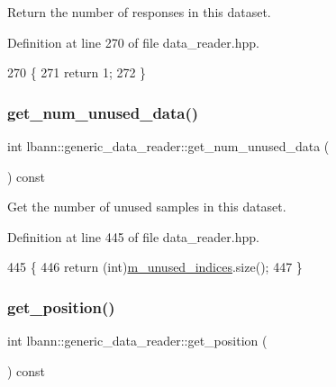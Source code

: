 Return the number of responses in this dataset. 



Definition at line 270 of file data\+\_\+reader.\+hpp.


\begin{DoxyCode}
270                                         \{
271     \textcolor{keywordflow}{return} 1;
272   \}
\end{DoxyCode}
\mbox{\label{classlbann_1_1generic__data__reader_a49d5244c292de9ca489761b940958afd}} 
\subsubsection{\texorpdfstring{get\+\_\+num\+\_\+unused\+\_\+data()}{get\_num\_unused\_data()}}
{\footnotesize\ttfamily int lbann\+::generic\+\_\+data\+\_\+reader\+::get\+\_\+num\+\_\+unused\+\_\+data (\begin{DoxyParamCaption}{ }\end{DoxyParamCaption}) const\hspace{0.3cm}{\ttfamily [inline]}}



Get the number of unused samples in this dataset. 



Definition at line 445 of file data\+\_\+reader.\+hpp.


\begin{DoxyCode}
445                                   \{
446     \textcolor{keywordflow}{return} (\textcolor{keywordtype}{int})\hyperlink{classlbann_1_1generic__data__reader_a0bc0ee42e95d23687ddcc30d6c338b19}{m\_unused\_indices}.size();
447   \}
\end{DoxyCode}
\mbox{\label{classlbann_1_1generic__data__reader_aa6e4e7a49d30502a0c60c39720ac2499}} 
\subsubsection{\texorpdfstring{get\+\_\+position()}{get\_position()}}
{\footnotesize\ttfamily int lbann\+::generic\+\_\+data\+\_\+reader\+::get\+\_\+position (\begin{DoxyParamCaption}{ }\end{DoxyParamCaption}) const\hspace{0.3cm}{\ttfamily [inline]}}




